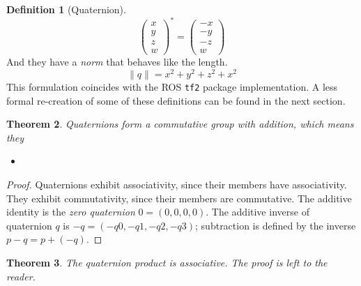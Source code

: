 \documentclass{amsart}
\newtheorem{theorem}{Theorem}[section]
\theoremstyle{definition}
\newtheorem{definition}[theorem]{Definition}
\theoremstyle{remark}
\numberwithin{equation}{section}
\begin{document}
\begin{definition}[Quaternion]
\begin{equation}
\begin{pmatrix}
      x \\
      y \\
      z \\
      w
    \end{pmatrix} ^ * =
    \begin{pmatrix}
      -x \\
      -y \\
      -z \\
      w
    \end{pmatrix}
  \end{equation}
  And they have a \emph{norm} that behaves like the length.
  \begin{equation}
    \|q\| = x^2 + y^2 + z^2 + x^2
  \end{equation}
  This formulation coincides with the ROS \texttt{tf2} package implementation. A less formal re-creation of some of these definitions can be found in the next section.
\end{definition}




\begin{theorem}
  Quaternions form a commutative group with addition, which means they 
  \begin{itemize}
    \item 
  \end{itemize}
  
\end{theorem}
\begin{proof}
  Quaternions exhibit associativity, since their members have associativity. They exhibit commutativity, since their members are commutative. The additive identity is the \emph{zero quaternion} $0=\left(0, 0, 0, 0\right)$. The additive inverse of quaternion $q$ is $-q=(-q0, -q1, -q2, -q3)$; subtraction is defined by the inverse $p-q = p+(-q)$.
\end{proof}

\begin{theorem}
  The quaternion product is associative. The proof is left to the reader.
\end{theorem}
\end{document}

